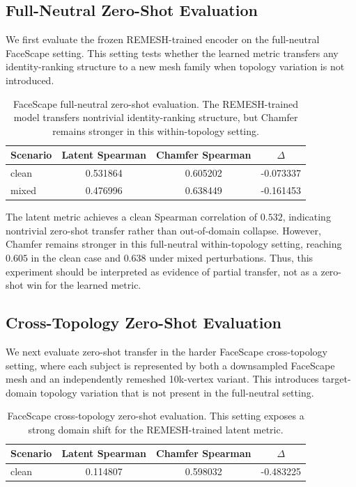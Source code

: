 \documentclass[10pt,twocolumn,letterpaper]{article}
\begin{document}
\subsection{Full-Neutral Zero-Shot Evaluation}
\label{app:faceverse_full_neutral}

We first evaluate the frozen REMESH-trained encoder on the full-neutral
FaceScape setting. This setting tests whether the learned metric transfers any
identity-ranking structure to a new mesh family when topology variation is not
introduced.

\begin{table}[h]
\centering
\footnotesize
\caption{
FaceScape full-neutral zero-shot evaluation. The REMESH-trained model transfers
nontrivial identity-ranking structure, but Chamfer remains stronger in this
within-topology setting.
}
\label{tab:faceverse_full_neutral_app}
\begin{tabular}{lccc}
\toprule
Scenario & Latent Spearman & Chamfer Spearman & $\Delta$ \\
\midrule
clean & 0.531864 & 0.605202 & -0.073337 \\
mixed & 0.476996 & 0.638449 & -0.161453 \\
\bottomrule
\end{tabular}
\end{table}

The latent metric achieves a clean Spearman correlation of $0.532$, indicating
nontrivial zero-shot transfer rather than out-of-domain collapse. However,
Chamfer remains stronger in this full-neutral within-topology setting, reaching
$0.605$ in the clean case and $0.638$ under mixed perturbations. Thus, this
experiment should be interpreted as evidence of partial transfer, not as a
zero-shot win for the learned metric.

\subsection{Cross-Topology Zero-Shot Evaluation}
\label{app:faceverse_xtopo_zeroshot}

We next evaluate zero-shot transfer in the harder FaceScape cross-topology
setting, where each subject is represented by both a downsampled FaceScape mesh
and an independently remeshed 10k-vertex variant. This introduces target-domain
topology variation that is not present in the full-neutral setting.

\begin{table}[h]
\centering
\footnotesize
\caption{
FaceScape cross-topology zero-shot evaluation. This setting exposes a strong
domain shift for the REMESH-trained latent metric.
}
\label{tab:faceverse_xtopo_zeroshot_app}
\begin{tabular}{lccc}
\toprule
Scenario & Latent Spearman & Chamfer Spearman & $\Delta$ \\
\midrule
clean & 0.114807 & 0.598032 & -0.483225 \\
\bottomrule
\end{tabular}
\end{table}
\end{document}
